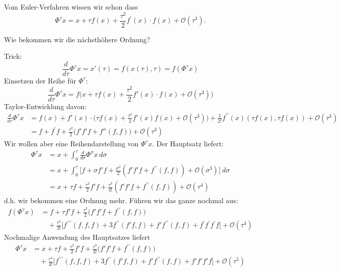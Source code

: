 Vom Euler-Verfahren wissen wir schon dass
\begin{equation*}
	\Phi^{\tau} x=x+\tau f(x)+\frac{\tau^2}{2} f^{\prime} (x) \cdot f(x)+\mathcal{O} (\tau^3).
\end{equation*}

Wie bekommen wir die nächsthöhere Ordnung?

Trick:
\begin{equation*}
	\frac{d}{d \tau} \Phi^{\tau} x  =x'(\tau) = f(x(\tau),\tau) = f(\Phi^{\tau} x )
\end{equation*}
Einsetzen der Reihe für $\Phi^\tau$:
\begin{equation*}
	\frac{d}{d \tau} \Phi^{\tau} x = f \Big(x+\tau f(x)+\frac{\tau^2}{2} f'(x) \cdot f(x)+\mathcal{O}(\tau^3) \Big)
\end{equation*}
Taylor-Entwicklung davon:
\begin{align*}
	\frac{d}{d \tau} \Phi^{\tau} x
	& =
	f(x)+f'(x) \cdot \Big(\tau f(x)+\frac{\tau^2}{2} f'(x)f(x)+\mathcal{O} (\tau^3) \Big)
	+\frac{1}{2!}f^{\prime \prime}(x) (\tau f(x),\tau f(x))+\mathcal{O}(\tau^3) \\
	& =
	f+f^{\prime} f + \frac{\tau^2}{2} \Big(f'f'f + f''(f,f)\Big) +\mathcal{O}(\tau^3)
\end{align*}
Wir wollen aber eine Reihendarstellung von $\Phi^\tau x$.
Der Hauptsatz liefert:
\begin{align*}
	\Phi^{\tau} x
	& =
	x+\int_0^{\tau} \frac{d}{d \sigma} \Phi^{\sigma} x\,d\sigma \\
	& = x+\int_0^{\tau} \Big[f+\sigma f'f+\frac{\sigma^2}{2} (f'f'f+f^{\prime \prime} (f,f) )
	+\mathcal{O} (\sigma^3) \Big]\ d \sigma \\
	& =x+\tau f+\frac{\tau^2}{2} f'f+\frac{\tau^3}{3!} (f' f' f+f^{\prime \prime} (f,f) )+\mathcal{O}(\tau^4)
\end{align*}
d.h. wir bekommen eine Ordnung mehr. Führen wir das ganze nochmal aus:
\begin{align*}
	f(\Phi^{\tau} x)
	& =
	f+\tau f'f+\frac{\tau^2}{2} \big(f'f'f+f^{\prime \prime} (f,f)\big) \\
	&
	\quad +\frac{\tau^3}{3!} \Big[f^{\prime \prime \prime} (f,f,f)
	+3 f^{\prime \prime} (f'f,f)+f'f^{\prime \prime} (f,f)+f^{\prime}f^{\prime}f^{\prime}f \Big]
	+\mathcal{O}(\tau^4)
\end{align*}
Nochmalige Anwendung des Hauptsatzes liefert
\begin{align*}
	\Phi^{\tau} x
	& =
	x+\tau f+\frac{\tau^2}{2} f'f+\frac{\tau^3}{3!} \big(f'f'f+f^{\prime \prime} (f,f) \big) \\
	&
	\quad +\frac{\tau^4}{4!} \Big[f^{\prime \prime \prime} (f,f,f)
	+3 f^{\prime \prime} (f'f,f)+f'f^{\prime \prime} (f,f)+f'f'f'f \Big]+\mathcal{O}(\tau^5)
\end{align*}

